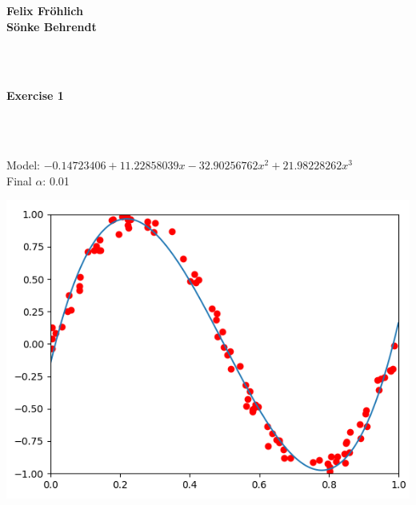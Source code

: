 \documentclass[a4paper]{article}
\begin{document}
\vspace*{-3cm}

\raggedleft
\textbf{Felix Fröhlich} \\
\textbf{Sönke Behrendt}

\centering {

}
~\\~\\
\begin{Large}
\textbf{Exercise 1}
\end{Large}

~\\~\\
\raggedright
Model: $-0.14723406 + 11.22858039x - 32.90256762x^2 + 21.98228262x^3$ \\
Final $\alpha$: 0.01

\centering
\includegraphics[width=1\textwidth]{graph.png}
\end{document}
